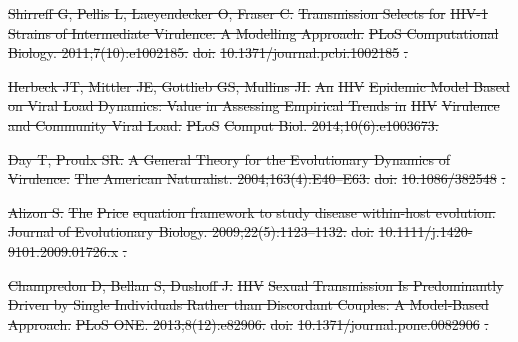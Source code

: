 \documentclass[10pt,letterpaper]{article}
\providecommand{\DIFdeltex}[1]{{\protect\color{red}\sout{#1}}}                      %
\providecommand{\DIFdel}[1]{\texorpdfstring{\DIFdeltex{#1}}{}} %
\begin{document}
\DIFdel{Shirreff G, Pellis L, Laeyendecker O, Fraser C.
}%
\DIFdel{Transmission Selects for }%
\DIFdel{HIV-1}%
\DIFdel{Strains of Intermediate Virulence: A
  Modelling Approach. }%
\DIFdel{PLoS Computational Biology. 2011;7(10):e1002185.
}%
\DIFdel{doi:}%
\DIFdel{10.1371/journal.pcbi.1002185}%
\DIFdel{.
}%

\DIFdel{Herbeck JT, Mittler JE, Gottlieb GS, Mullins JI.
}%
\DIFdel{An }%
\DIFdel{HIV}%
\DIFdel{Epidemic Model Based on Viral Load Dynamics: Value in
  Assessing Empirical Trends in }%
\DIFdel{HIV}%
\DIFdel{Virulence and Community Viral Load. }%
\DIFdel{PLoS}%
\DIFdel{Comput Biol. 2014;10(6):e1003673.
}%

\DIFdel{Day T, Proulx SR. }%
\DIFdel{A General Theory for the Evolutionary Dynamics of Virulence.
}%
\DIFdel{The American Naturalist. 2004;163(4):E40--E63.
}%
\DIFdel{doi:}%
\DIFdel{10.1086/382548}%
\DIFdel{.
}%

\DIFdel{Alizon S.
}%
\DIFdel{The }%
\DIFdel{Price}%
\DIFdel{equation framework to study disease within-host
  evolution.
}%
\DIFdel{Journal of Evolutionary Biology. 2009;22(5):1123--1132.
}%
\DIFdel{doi:}%
\DIFdel{10.1111/j.1420-9101.2009.01726.x}%
\DIFdel{.
}%

\DIFdel{Champredon D, Bellan S, Dushoff J.
}%
\DIFdel{HIV}%
\DIFdel{Sexual Transmission Is Predominantly Driven by Single
  Individuals Rather than Discordant Couples: A Model-Based Approach.
}%
\DIFdel{PLoS ONE. 2013;8(12):e82906.
}%
\DIFdel{doi:}%
\DIFdel{10.1371/journal.pone.0082906}%
\DIFdel{.
}%
\end{document}
